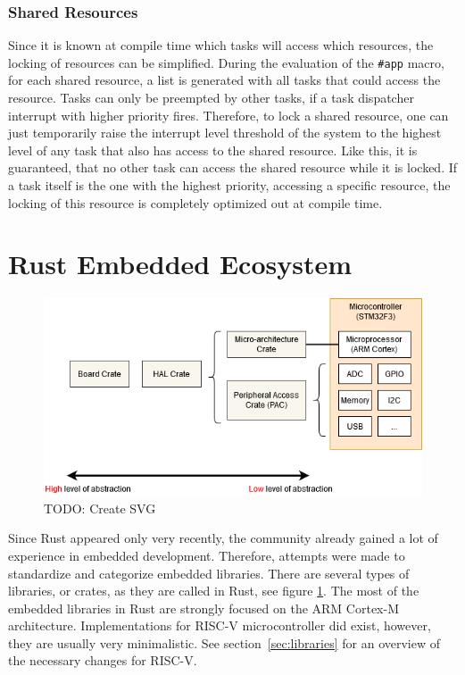 \subsubsection{Shared Resources}
\label{sec:shared_resources}
Since it is known at compile time which tasks will access which resources, the locking of resources can be simplified.
During the evaluation of the \texttt{\#app} macro, for each shared resource, a list is generated with all tasks that could access the resource.
Tasks can only be preempted by other tasks, if a task dispatcher interrupt with higher priority fires.
Therefore, to lock a shared resource, one can just temporarily raise the interrupt level threshold of the system to the highest level of any task that also has access to the shared resource. Like this, it is guaranteed, that no other task can access the shared resource while it is locked.
If a task itself is the one with the highest priority, accessing a specific resource, the locking of this resource is completely optimized out at compile time.

\section{Rust Embedded Ecosystem}

\begin{figure}
  \centerfloat
  \includegraphics[width=\textwidth]{fig/crates.png}
  \caption{TODO: Create SVG}%
  \label{fig:embedded_crates}
\end{figure}

Since Rust appeared only very recently, the community already gained a lot of experience in embedded development.
Therefore, attempts were made to standardize and categorize embedded libraries.
There are several types of libraries, or crates, as they are called in Rust, see figure \ref{fig:embedded_crates}.
The most of the embedded libraries in Rust are strongly focused on the ARM Cortex-M architecture. Implementations for RISC-V microcontroller did exist, however, they are usually very minimalistic. See section~\ref{sec:libraries} for an overview of the necessary changes for RISC-V.


